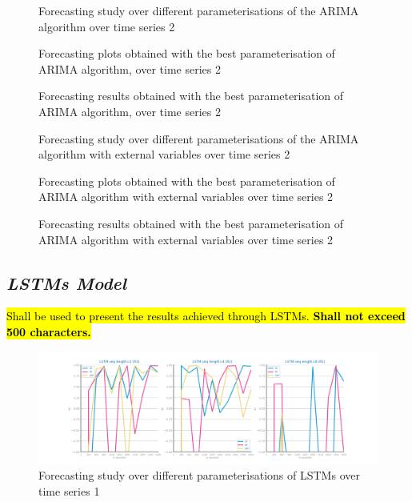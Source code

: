 \documentclass[10pt]{extarticle}
\newcommand{\ctext}[3][RGB]{%
  \begingroup
  \definecolor{hlcolor}{#1}{#2}\sethlcolor{hlcolor}%
  \hl{#3}%
  \endgroup
}
\begin{document}
\begin{figure}[H]
\caption{Forecasting study over different parameterisations of the ARIMA algorithm over time series 2}
\end{figure}

\begin{figure}[H]
\caption{Forecasting plots obtained with the best parameterisation of ARIMA algorithm, over time series 2}
\end{figure}

\begin{figure}[H]
\caption{Forecasting results obtained with the best parameterisation of ARIMA algorithm, over time series 2}
\end{figure}

\begin{figure}[H]
\caption{Forecasting study over different parameterisations of the ARIMA algorithm with external variables over time series 2}
\end{figure}

\begin{figure}[H]
\caption{Forecasting plots obtained with the best parameterisation of ARIMA algorithm with external variables over time series 2}
\end{figure}

\begin{figure}[H]
\caption{Forecasting results obtained with the best parameterisation of ARIMA algorithm with external variables over time series 2}
\end{figure}

\subsection*{\textit{LSTMs Model}}
\ctext[RGB]{190,190,190}{Shall be used to present the results achieved through LSTMs.  \textbf{Shall not exceed 500 characters.}}

\begin{figure}[H]
\centering\includegraphics[scale=0.4]{images/dataset1/time_series/Covid_lstm_study_R2.png}
\caption{Forecasting study over different parameterisations of LSTMs over time series 1}
\end{figure}
\end{document}
